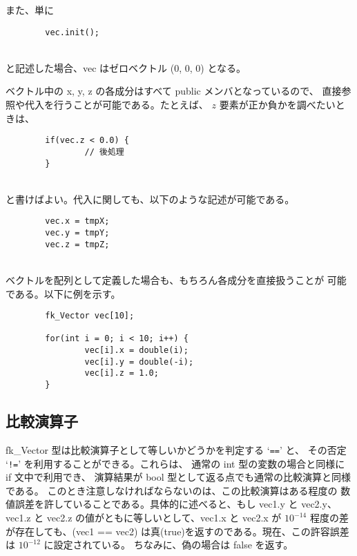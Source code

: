 また、単に
\\
\begin{screen}
\begin{verbatim}
        vec.init();
\end{verbatim}
\end{screen}
~ \\
と記述した場合、vec はゼロベクトル (0, 0, 0) となる。

ベクトル中の x, y, z の各成分はすべて public メンバとなっているので、
直接参照や代入を行うことが可能である。たとえば、
\(z\) 要素が正か負かを調べたいときは、
\\
\begin{screen}
\begin{verbatim}
        if(vec.z < 0.0) {
                // 後処理
        }
\end{verbatim}
\end{screen}
~ \\
と書けばよい。代入に関しても、以下のような記述が可能である。
\\
\begin{screen}
\begin{verbatim}
        vec.x = tmpX;
        vec.y = tmpY;
        vec.z = tmpZ;
\end{verbatim}
\end{screen}
~ \\
ベクトルを配列として定義した場合も、もちろん各成分を直接扱うことが
可能である。以下に例を示す。
\\
\begin{screen}
\begin{verbatim}
        fk_Vector vec[10];

        for(int i = 0; i < 10; i++) {
                vec[i].x = double(i);
                vec[i].y = double(-i);
                vec[i].z = 1.0;
        }
\end{verbatim}
\end{screen}
\subsection{比較演算子}
fk\_Vector 型は比較演算子として等しいかどうかを判定する `\verb+==+' と、
その否定 `\verb+!=+' を利用することができる。これらは、
通常の int 型の変数の場合と同様に if 文中で利用でき、
演算結果が bool 型として返る点でも通常の比較演算と同様である。
このとき注意しなければならないのは、この比較演算はある程度の
数値誤差を許していることである。具体的に述べると、もし vec1.y
と vec2.y、vec1.z と vec2.z の値がともに等しいとして、vec1.x
と vec2.x が \(10^{-14}\) 程度の差が存在しても、(vec1 == vec2)
は真(true)を返すのである。現在、この許容誤差は \(10^{-12}\) に設定されている。
ちなみに、偽の場合は false を返す。
